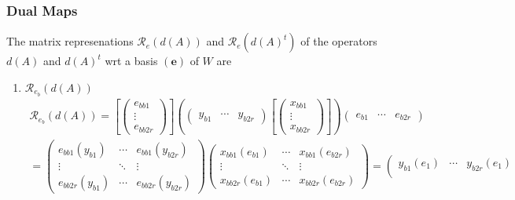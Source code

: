 \documentclass[aps,preprint]{revtex4}
\begin{document}
\subsubsection{Dual Maps}

The matrix represenations $\mathcal{R}_{e}\left( d\left( A\right) \right) $
and $\mathcal{R}_{e}\left( d\left( A\right) ^{t}\right) $ of the operators $%
d\left( A\right) $ and $d\left( A\right) ^{t}$ wrt a basis $\left( 
\boldsymbol{e}\right) $ of $W$ are

\begin{enumerate}
\item $\mathcal{R}_{e_{b}}\left( d\left( A\right) \right) $%
\begin{gather}
\mathcal{R}_{e_{b}}\left( d\left( A\right) \right) =\left[ \left( 
\begin{array}{c}
e_{bb1} \\ 
\vdots \\ 
e_{bb2r}%
\end{array}%
\right) \right] \left( \left( 
\begin{array}{ccc}
y_{b1} & \cdots & y_{b2r}%
\end{array}%
\right) \left[ \left( 
\begin{array}{c}
x_{bb1} \\ 
\vdots \\ 
x_{bb2r}%
\end{array}%
\right) \right] \right) \left( 
\begin{array}{ccc}
e_{b1} & \cdots & e_{b2r}%
\end{array}%
\right) \\
=\left( 
\begin{array}{ccc}
e_{bb1}\left( y_{b1}\right) & \cdots & e_{bb1}\left( y_{b2r}\right) \\ 
\vdots & \ddots & \vdots \\ 
e_{bb2r}\left( y_{b1}\right) & \cdots & e_{bb2r}\left( y_{b2r}\right)%
\end{array}%
\right) \left( 
\begin{array}{ccc}
x_{bb1}\left( e_{b1}\right) & \cdots & x_{bb1}\left( e_{b2r}\right) \\ 
\vdots & \ddots & \vdots \\ 
x_{bb2r}\left( e_{b1}\right) & \cdots & x_{bb2r}\left( e_{b2r}\right)%
\end{array}%
\right) =\left( 
\begin{array}{ccc}
y_{b1}\left( e_{1}\right) & \cdots & y_{b2r}\left( e_{1}\right) \\ 

\end{array}
\end{gather}
\end{enumerate}
\end{document}
